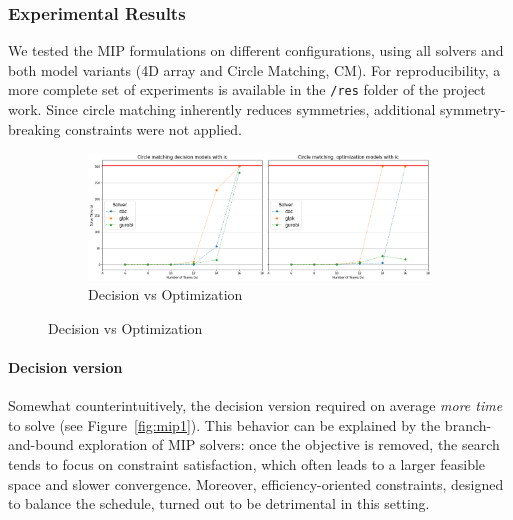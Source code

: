 \subsubsection{Experimental Results}
We tested the MIP formulations on different configurations, using all solvers and both model variants (4D array and Circle Matching, CM). 
For reproducibility, a more complete set of experiments is available in the \texttt{/res} folder of the project work. 
Since circle matching inherently reduces symmetries, additional symmetry-breaking constraints were not applied.


\begin{figure}[H]
    \label{fig:mip1}
    \centering
    \begin{subfigure}{\linewidth}
        \centering
        \includegraphics[width=\linewidth]{imgs/plot1.png}
        \caption{Decision vs Optimization}
    \end{subfigure}
\end{figure}

\paragraph{Decision version}
Somewhat counterintuitively, the decision version required on average \emph{more time} to solve (see Figure~\ref{fig:mip1}). 
This behavior can be explained by the branch-and-bound exploration of MIP solvers: once the objective is removed, the search tends to focus on constraint satisfaction, which often leads to a larger feasible space and slower convergence.
Moreover, efficiency-oriented constraints, designed to balance the schedule, turned out to be detrimental in this setting.


